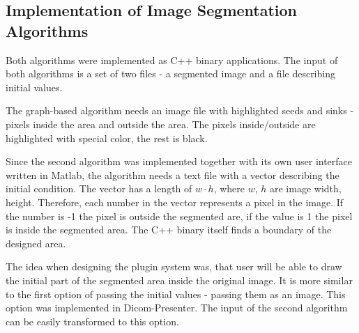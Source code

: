 \subsection{Implementation of Image Segmentation Algorithms}
Both algorithms were implemented as C++ binary applications. The input of both algorithms is a set of two files - a segmented image and a file describing initial values.

The graph-based algorithm needs an image file with highlighted seeds and sinks - pixels inside the area and outside the area. The pixels inside/outside are highlighted with special color, the rest is black.

Since the second algorithm was implemented together with its own user interface written in Matlab, the algorithm needs a text file with a vector describing the initial condition. The vector has a length of $w \cdot h$, where $w$, $h$ are image width, height. Therefore, each number in the vector represents a pixel in the image. If the number is -1 the pixel is outside the segmented are, if the value is 1 the pixel is inside the segmented area. The C++ binary itself finds a boundary of the designed area.

The idea when designing the plugin system was, that user will be able to draw the initial part of the segmented area inside the original image. It is more similar to the first option of passing the initial values - passing them as an image. This option was implemented in Dicom-Presenter. The input of the second algorithm can be easily transformed to this option.

